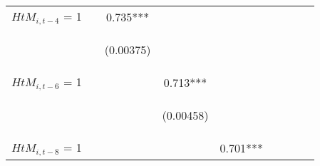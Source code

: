\begin{center}
\begin{tabular}{lcccccccc}
$ {HtM}_{i, t-4} $ = 1 &  & 0.735*** &  &  &  &  &  &  \\
\vspace{4pt} & \begin{footnotesize}\end{footnotesize} & \begin{footnotesize}(0.00375)\end{footnotesize} & \begin{footnotesize}\end{footnotesize} & \begin{footnotesize}\end{footnotesize} & \begin{footnotesize}\end{footnotesize} & \begin{footnotesize}\end{footnotesize} & \begin{footnotesize}\end{footnotesize} & \begin{footnotesize}\end{footnotesize} \\
$ {HtM}_{i, t-6} $ = 1 &  &  & 0.713*** &  &  &  &  &  \\
\vspace{4pt} & \begin{footnotesize}\end{footnotesize} & \begin{footnotesize}\end{footnotesize} & \begin{footnotesize}(0.00458)\end{footnotesize} & \begin{footnotesize}\end{footnotesize} & \begin{footnotesize}\end{footnotesize} & \begin{footnotesize}\end{footnotesize} & \begin{footnotesize}\end{footnotesize} & \begin{footnotesize}\end{footnotesize} \\
$ {HtM}_{i, t-8} $ = 1 &  &  &  & 0.701*** &  &  &  &  \\

\end{tabular}
\end{center}
